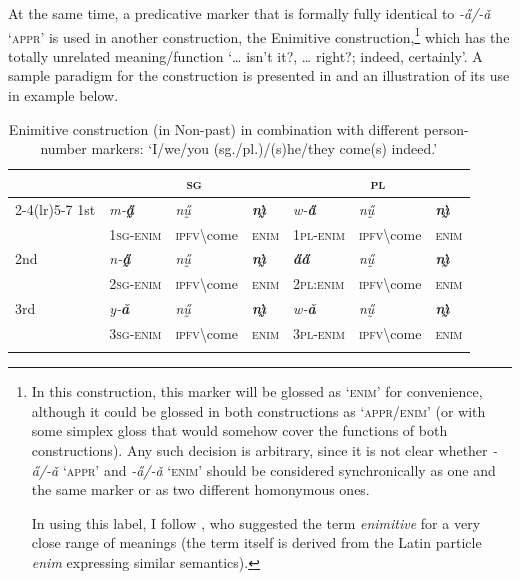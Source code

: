 \documentclass[output=paper,colorlinks,citecolor=brown
]{langscibook}
\begin{document}
At the same time, a predicative marker that is formally fully identical to \textit{-a̋/-ǎ} `\textsc{appr}' is used in another construction, the Enimitive construction,\footnote{In this construction, this marker will be glossed as `\textsc{enim}' for convenience, although it could be glossed in both constructions as `\textsc{appr/enim}' (or with some simplex gloss that would somehow cover the functions of both constructions). Any such decision is arbitrary, since it is not clear whether \textit{-a̋/-ǎ} `\textsc{appr}' and \textit{-a̋/-ǎ} `\textsc{enim}' should be considered synchronically as one and the same marker or as two different homonymous ones.

In using this label, I follow \citet{panov2020}, who suggested the term \textit{enimitive} for a very close range of meanings (the term itself is derived from the Latin particle \textit{enim} expressing similar semantics).} which has the totally unrelated meaning\slash function `{\dots} isn't it?, {\dots} right?; indeed, certainly'. A sample paradigm for the construction is presented in  and an illustration of its use in example  below.


\begin{table}

\begin{tabular}{l llllll}
\lsptoprule
 & \multicolumn{3}{c}{\textsc{sg}} & \multicolumn{3}{c}{\textsc{pl}} \\ \cmidrule(lr){2-4}\cmidrule(lr){5-7}
1st & \textit{m‑\textbf{a̰̋}} & \textit{nṵ̋} & \textit{\textbf{nı̰̀}} & \textit{w‑\textbf{a̋}} & \textit{nṵ̋} & \textit{\textbf{nı̰̀}} \\
 & \textsc{1sg-enim} & \textsc{ipfv}\backslash come & \textsc{enim} & \textsc{1pl-enim} & \textsc{ipfv}\backslash come & \textsc{enim} \\ \addlinespace
2nd & \textit{n‑\textbf{a̰̋}} & \textit{nṵ̋} & \textit{\textbf{nı̰̀}} & \textit{\textbf{a̋a̋}} & \textit{nṵ̋} & \textit{\textbf{nı̰̀}} \\
 & \textsc{2sg-enim} & \textsc{ipfv}\backslash come & \textsc{enim} & \textsc{2pl:enim} & \textsc{ipfv}\backslash come & \textsc{enim} \\ \addlinespace
3rd & \textit{y‑\textbf{ǎ}} & \textit{nṵ̋} & \textit{\textbf{nı̰̀}} & \textit{w‑\textbf{ǎ}} & \textit{nṵ̋} & \textit{\textbf{nı̰̀}} \\
 & \textsc{3sg-enim} & \textsc{ipfv}\backslash come & \textsc{enim} & \textsc{3pl-enim} & \textsc{ipfv}\backslash come & \textsc{enim} \\
\lspbottomrule
\end{tabular}
\caption{Enimitive construction (in Non-past) in combination with different person-number markers: `I/we/you (sg./pl.)/(s)he/they come(s) indeed.'}
\label{tab3}
\end{table}
\end{document}
